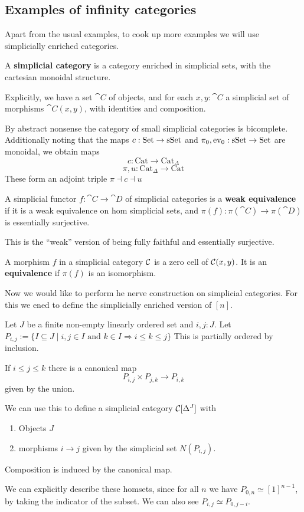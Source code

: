 \subsection{Examples of infinity categories}

Apart from the usual examples, to cook up more examples we will use simplicially enriched categories.
\begin{definition}
    A  \textbf{simplicial category} is a category enriched in simplicial sets, with the cartesian monoidal structure.

    Explicitly, we have a set $\cat{C}$ of objects, and for each $x,y : \cat{C}$ a simplicial set of morphisms $\cat{C}(x,y)$, with identities and composition.

    By abstract nonsense the category of small simplicial categories is bicomplete.
    Additionally noting that the maps $c : \mathrm{Set} \to \mathrm{sSet}$ and $\pi_0, \mathrm{ev}_0 : \mathrm{sSet} \to \mathrm{Set}$ are monoidal, we obtain maps
    \[ c : \mathrm{Cat} \to \mathrm{Cat}_\Delta \]
    \[ \pi, u : \mathrm{Cat}_\Delta \to \mathrm{Cat} \]
    These form an adjoint triple $\pi \dashv c \dashv u$
\end{definition}

\begin{definition}
    A simplicial functor $f : \cat{C} \to \cat{D}$ of simplicial categories is a \textbf{weak equivalence} if it is a weak equivalence on hom simplicial sets,
    and $\pi(f) : \pi(\cat{C}) \to \pi(\cat{D})$ is essentially surjective.

    This is the ``weak'' version of being fully faithful and essentially surjective.
\end{definition}

\begin{definition}
    A morphism $f$ in a simplicial category $\mathcal{C}$ is a zero cell of $\mathcal{C}(x, y)$.
    It is an \textbf{equivalence} if $\pi(f)$ is an isomorphism.
\end{definition}

Now we would like to perform he nerve construction on simplicial categories.
For this we ened to define the simplicially enriched version of $[n]$.

\begin{definition}
    Let $J$ be a finite non-empty linearly ordered set and $i, j : J$.
    Let $P_{i,j} := \{ I \subseteq J \mid i, j \in I \text{ and } k \in I \Rightarrow i \leq k \leq j \}$
    This is partially ordered by inclusion.

    If $i \leq j \leq k$ there is a canonical map
    \[ P_{i, j} \times P_{j,k} \to P_{i,k} \]
    given by the union.

    We can use this to define a simplicial category $\mathcal{C}[\Delta^J]$ with
    \begin{enumerate}
        \item Objects $J$
        \item morphisms $i \to j$ given by the simplicial set $N(P_{i,j})$.
    \end{enumerate}
    Composition is induced by the canonical map.
\end{definition}

We can explicitly describe these homsets, since for all $n$ we have $P_{0,n} \simeq [1]^{n-1}$, 
by taking the indicator of the subset.
We can also see $P_{i, j} \simeq P_{0, j-i}$. 